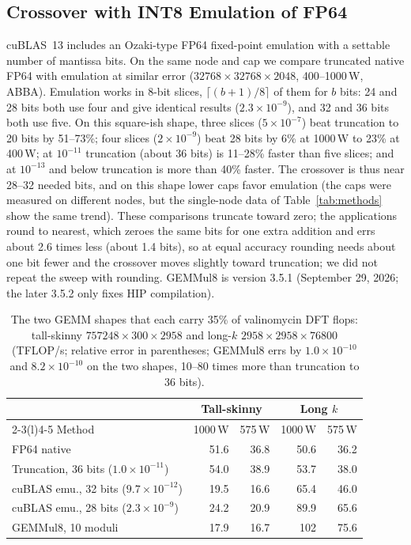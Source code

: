 \documentclass[conference]{IEEEtran}
\newcommand{\W}{\,W}
\newcommand{\ee}[2]{#1{\times}10^{#2}}  %
\newcommand{\pct}{\%}
\begin{document}
\subsection{Crossover with INT8 Emulation of FP64}\label{sec:crossover}

cuBLAS~13 includes an Ozaki-type FP64 fixed-point emulation with a settable number of mantissa bits. On the same
node and cap we compare truncated native FP64 with emulation at similar error ($32768{\times}32768{\times}2048$,
400--1000\W, ABBA). Emulation works in 8-bit slices, $\lceil(b+1)/8\rceil$ of them for $b$ bits: 24 and 28 bits
both use four and give identical results ($\ee{2.3}{-9}$), and 32 and 36 bits both use five. On this square-ish
shape, three slices ($\ee{5}{-7}$) beat truncation to 20 bits by 51--73\pct; four slices ($\ee{2}{-9}$) beat 28 bits
by 6\pct{} at 1000\W{} to 23\pct{} at 400\W; at $10^{-11}$ truncation (about 36 bits) is 11--28\pct{} faster than
five slices; and at $10^{-13}$ and below truncation is more than 40\pct{} faster. The crossover is thus near 28--32
needed bits, and on this shape lower caps favor emulation (the caps were measured on different nodes, but the
single-node data of Table~\ref{tab:methods} show the same trend). These comparisons truncate toward zero; the
applications round to nearest, which zeroes the same bits for one extra addition and errs about 2.6 times less
(about 1.4 bits), so at equal accuracy rounding needs about one bit fewer and the crossover moves slightly toward
truncation; we did not repeat the sweep with rounding. GEMMul8 is version 3.5.1 (September 29, 2026; the later 3.5.2
only fixes HIP compilation).

\begin{table}[t]
\caption{The two GEMM shapes that each carry 35\pct{} of valinomycin DFT flops: tall-skinny
$757248{\times}300{\times}2958$ and long-$k$ $2958{\times}2958{\times}76800$ (TFLOP/s; relative error in parentheses;
GEMMul8 errs by $\ee{1.0}{-10}$ and $\ee{8.2}{-10}$ on the two shapes, 10--80 times more than truncation to 36
bits).}\label{tab:shape}
\centering\footnotesize\setlength{\tabcolsep}{4pt}
\begin{tabular}{@{}lrrrr@{}}
\toprule
& \multicolumn{2}{c}{Tall-skinny} & \multicolumn{2}{c}{Long $k$} \\
\cmidrule(lr){2-3}\cmidrule(l){4-5}
Method & 1000\W & 575\W & 1000\W & 575\W \\
\midrule
FP64 native & 51.6 & 36.8 & 50.6 & 36.2 \\
Truncation, 36 bits ($\ee{1.0}{-11}$) & 54.0 & 38.9 & 53.7 & 38.0 \\
cuBLAS emu., 32 bits ($\ee{9.7}{-12}$) & 19.5 & 16.6 & 65.4 & 46.0 \\
cuBLAS emu., 28 bits ($\ee{2.3}{-9}$) & 24.2 & 20.9 & 89.9 & 65.6 \\
GEMMul8, 10 moduli & 17.9 & 16.7 & 102 & 75.6 \\
\bottomrule
\end{tabular}
\end{table}
\end{document}
